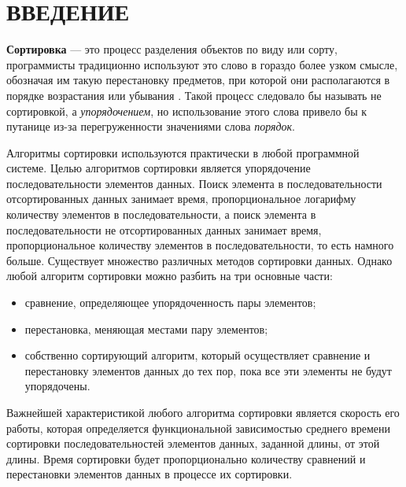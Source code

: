 {\centering \chapter*{ВВЕДЕНИЕ}}

\textbf{Сортировка} --- это процесс разделения объектов по виду или сорту, программисты традиционно используют это слово в гораздо более узком смысле, обозначая им такую перестановку предметов, при которой они располагаются в порядке возрастания или убывания \cite{knut}.
Такой процесс следовало бы называть не сортировкой, а \textit{упорядочением}, но использование этого слова привело бы к путанице из-за перегруженности значениями слова \textit{порядок}.

Алгоритмы сортировки используются практически в любой программной системе.
Целью алгоритмов сортировки является упорядочение последовательности элементов данных.
Поиск элемента в последовательности отсортированных данных занимает время, пропорциональное логарифму количеству элементов в последовательности, а поиск элемента в последовательности не отсортированных данных занимает время, пропорциональное количеству элементов в последовательности, то есть намного больше.
Существует множество различных методов сортировки данных.
Однако любой алгоритм сортировки можно разбить на три основные части:
\begin{itemize}[label=---]
    \item сравнение, определяющее упорядоченность пары элементов;
    \item перестановка, меняющая местами пару элементов;
    \item собственно сортирующий алгоритм, который осуществляет сравнение и перестановку элементов данных до тех пор, пока все эти элементы не будут упорядочены.
\end{itemize}

Важнейшей характеристикой любого алгоритма сортировки является скорость его работы, которая определяется функциональной зависимостью среднего времени сортировки последовательностей элементов данных, заданной длины, от этой длины. Время сортировки будет пропорционально количеству сравнений и перестановки элементов данных в процессе их сортировки.
